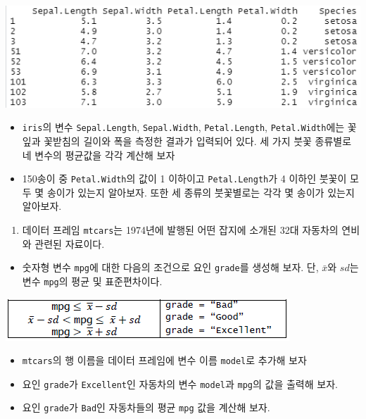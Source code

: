 \documentclass[
]{book}
\providecommand{\tightlist}{%
  \setlength{\itemsep}{0pt}\setlength{\parskip}{0pt}}
\begin{document}
\includegraphics[width=5.95833in,height=\textheight]{Figure/ch2_ex_21_1.png}

\begin{itemize}
\item
  \texttt{iris}의 변수 \texttt{Sepal.Length}, \texttt{Sepal.Width}, \texttt{Petal.Length}, \texttt{Petal.Width}에는 꽃잎과 꽃받침의 길이와 폭을 측정한 결과가 입력되어 있다. 세 가지 붓꽃 종류별로 네 변수의 평균값을 각각 계산해 보자
\item
  150송이 중 \texttt{Petal.Width}의 값이 1 이하이고 \texttt{Petal.Length}가 4 이하인 붓꽃이 모두 몇 송이가 있는지 알아보자. 또한 세 종류의 붓꽃별로는 각각 몇 송이가 있는지 알아보자.
\end{itemize}

\begin{enumerate}
\def\labelenumi{\arabic{enumi}.}
\setcounter{enumi}{1}
\tightlist
\item
  데이터 프레임 \texttt{mtcars}는 1974년에 발행된 어떤 잡지에 소개된 32대 자동차의 연비와 관련된 자료이다.
\end{enumerate}

\begin{itemize}
\tightlist
\item
  숫자형 변수 \texttt{mpg}에 대한 다음의 조건으로 요인 \texttt{grade}를 생성해 보자. 단, \(\bar{x}\)와 \(sd\)는 변수 \texttt{mpg}의 평균 및 표준편차이다.
\end{itemize}

\includegraphics{Figure/ch2_ex_21_2.PNG}

\begin{itemize}
\item
  \texttt{mtcars}의 행 이름을 데이터 프레임에 변수 이름 \texttt{model}로 추가해 보자
\item
  요인 \texttt{grade}가 \texttt{Excellent}인 자동차의 변수 \texttt{model}과 \texttt{mpg}의 값을 출력해 보자.
\item
  요인 \texttt{grade}가 \texttt{Bad}인 자동차들의 평균 \texttt{mpg} 값을 계산해 보자.
\end{itemize}
\end{document}

